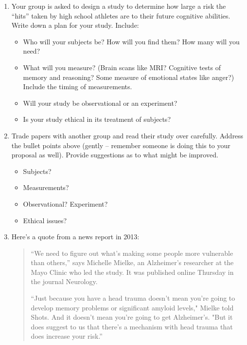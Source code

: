 \begin{enumerate}
\begin{enumerate}
\end{enumerate}
    \item Your group is asked to design a study to
      determine how large a risk the ``hits'' taken by high school
      athletes are to their future cognitive abilities. Write down
      a plan for your study.  Include:
      \begin{itemize}
      \item Who will your subjects be?  How will you find them? How
        many will you need? 
      \item What will you measure? (Brain scans like MRI?  Cognitive
        tests of memory and reasoning?  Some measure of emotional
        states like anger?) Include the timing of measurements.
      \item Will your study be observational or an experiment?
      \item Is your study ethical in its treatment of subjects?
      \end{itemize}
   \newpage

    \item Trade papers with another group and read their study over
      carefully. Address the bullet points above  (gently --
      remember someone is doing this to your proposal as well).
      Provide suggestions as to what might be improved.
      \begin{itemize}
      \item Subjects?
      \item Measurements?
      \item Observational? Experiment?
      \item Ethical issues?
      \end{itemize}
      \vspace{5in}


\item Here's a quote from a news report in 2013:
{\footnotesize
  \begin{quotation}
    ``We need to figure out what's making some people more vulnerable
    than others,'' says Michelle Mielke, an Alzheimer's researcher at
    the Mayo Clinic who led the study. It was published online
    Thursday in the journal Neurology. 

``Just because you have a head trauma doesn't mean you're going to
develop memory problems or significant amyloid levels," Mielke told
Shots. And it doesn't mean you're going to get Alzheimer's. "But it
does suggest to us that there's a mechanism with head trauma that does
increase your risk.''


\end{quotation}}
\end{enumerate}
